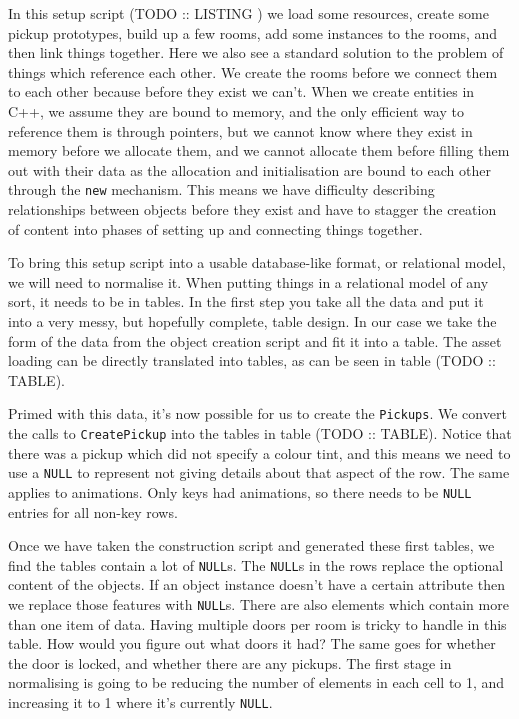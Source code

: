 \documentclass[a4paper,12pt]{book}
\begin{document}
In this setup script (TODO :: LISTING ) we load some resources, create some pickup prototypes, build up a few rooms, add some instances to the rooms, and then link things together.
Here we also see a standard solution to the problem of things which reference each other.
We create the rooms before we connect them to each other because before they exist we can't.
When we create entities in C++, we assume they are bound to memory, and the only efficient way to reference them is through pointers, but we cannot know where they exist in memory before we allocate them, and we cannot allocate them before filling them out with their data as the allocation and initialisation are bound to each other through the \texttt{new} mechanism.
This means we have difficulty describing relationships between objects before they exist and have to stagger the creation of content into phases of setting up and connecting things together.

To bring this setup script into a usable database-like format, or relational model, we will need to normalise it.
When putting things in a relational model of any sort, it needs to be in tables.
In the first step you take all the data and put it into a very messy, but hopefully complete, table design.
In our case we take the form of the data from the object creation script and fit it into a table.
The asset loading can be directly translated into tables, as can be seen in table (TODO :: TABLE).

Primed with this data, it's now possible for us to create the \texttt{Pickups}.
We convert the calls to \texttt{CreatePickup} into the tables in table (TODO :: TABLE).
Notice that there was a pickup which did not specify a colour tint, and this means we need to use a \texttt{NULL} to represent not giving details about that aspect of the row.
The same applies to animations.
Only keys had animations, so there needs to be \texttt{NULL} entries for all non-key rows.

Once we have taken the construction script and generated these first tables, we find the tables contain a lot of \texttt{NULL}s.
The \texttt{NULL}s in the rows replace the optional content of the objects.
If an object instance doesn't have a certain attribute then we replace those features with \texttt{NULL}s.
There are also elements which contain more than one item of data.
Having multiple doors per room is tricky to handle in this table.
How would you figure out what doors it had?
The same goes for whether the door is locked, and whether there are any pickups.
The first stage in normalising is going to be reducing the number of elements in each cell to 1, and increasing it to 1 where it's currently \texttt{NULL}.
\end{document}
